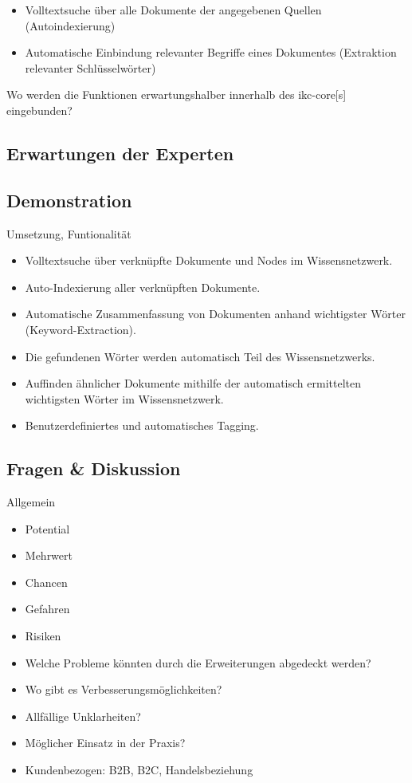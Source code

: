 \begin{itemize}
    \item Volltextsuche über alle Dokumente der angegebenen Quellen (Autoindexierung)
    \item Automatische Einbindung relevanter Begriffe eines Dokumentes (Extraktion relevanter Schlüsselwörter)
\end{itemize}

Wo werden die Funktionen erwartungshalber innerhalb des \gls{ikc-core}[s] eingebunden?

\subsection{Erwartungen der Experten}


\subsection{Demonstration}

Umsetzung, Funtionalität

\begin{itemize}
    \item Volltextsuche über verknüpfte Dokumente und Nodes im Wissensnetzwerk.
    \item Auto-Indexierung aller verknüpften Dokumente.
    \item Automatische Zusammenfassung von Dokumenten anhand wichtigster Wörter (Keyword-Extraction).
    \item Die gefundenen Wörter werden automatisch Teil des Wissensnetzwerks.
    \item Auffinden ähnlicher Dokumente mithilfe der automatisch ermittelten wichtigsten Wörter im Wissensnetzwerk.
    \item Benutzerdefiniertes und automatisches Tagging.
\end{itemize}

\subsection{Fragen \& Diskussion}

Allgemein

\begin{itemize}
    \item Potential
    \item Mehrwert
    \item Chancen
    \item Gefahren
    \item Risiken
\end{itemize}


\begin{itemize}
    \item Welche Probleme könnten durch die Erweiterungen abgedeckt werden?
    \item Wo gibt es Verbesserungsmöglichkeiten?
    \item Allfällige Unklarheiten?
    \item Möglicher Einsatz in der Praxis?
    \item Kundenbezogen: B2B, B2C, Handelsbeziehung
\end{itemize}